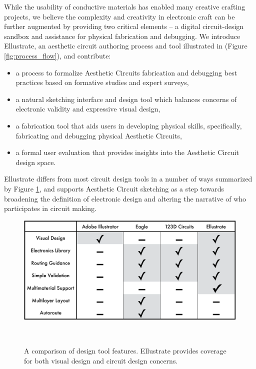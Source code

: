 \documentclass{sigchi}
\begin{document}
While the usability of conductive materials has enabled many creative crafting projects, we believe the complexity and creativity in electronic craft can be further augmented by providing two critical elements -- a digital circuit-design sandbox and assistance for physical fabrication and debugging. We introduce Ellustrate, an aesthetic circuit authoring process and tool illustrated in (Figure \ref{fig:process_flow}), and contribute: 
\begin{itemize}
    \item a process to formalize Aesthetic Circuits fabrication and debugging best practices based on formative studies and expert surveys,
    \item a natural sketching interface and design tool which balances concerns of electronic validity and expressive visual design,
    \item a fabrication tool that aids users in developing physical skills, specifically, fabricating and debugging physical Aesthetic Circuits,
    \item a formal user evaluation that provides insights into the Aesthetic Circuit design space.
\end{itemize}
Ellustrate differs from most circuit design tools in a number of ways summarized by Figure \ref{fig:comparison_table}, and supports Aesthetic Circuit sketching as a step towards broadening the definition of electronic design and altering the narrative of who participates in circuit making.




\begin{figure}[b]
\centering
  \includegraphics[width=1\columnwidth]{figures/comparative_table.pdf}
  \caption{A comparison of design tool features. Ellustrate provides coverage for both visual design and circuit design concerns. }~\label{fig:comparison_table}
  \vspace{-16pt}
\end{figure}
\end{document}
